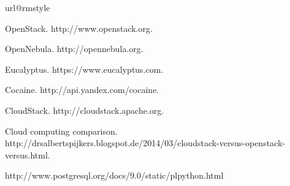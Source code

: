 
%
%
%

\begin{thebibliography}{10}
\providecommand{\url}[1]{#1}
\csname url@rmstyle\endcsname
\providecommand{\newblock}{\relax}
\providecommand{\bibinfo}[2]{#2}
\providecommand\BIBentrySTDinterwordspacing{\spaceskip=0pt\relax}
\providecommand\BIBentryALTinterwordstretchfactor{4}
\providecommand\BIBentryALTinterwordspacing{\spaceskip=\fontdimen2\font plus
\BIBentryALTinterwordstretchfactor\fontdimen3\font minus
  \fontdimen4\font\relax}
\providecommand\BIBforeignlanguage[2]{{%
\expandafter\ifx\csname l@#1\endcsname\relax
\typeout{** WARNING: IEEEtran.bst: No hyphenation pattern has been}%
\typeout{** loaded for the language `#1'. Using the pattern for}%
\typeout{** the default language instead.}%
\else
\language=\csname l@#1\endcsname
\fi
#2}}



OpenStack. http://www.openstack.org.

OpenNebula. http://opennebula.org.

Eucalyptus. https://www.eucalyptus.com.

Cocaine. http://api.yandex.com/cocaine.

CloudStack. http://cloudstack.apache.org.

Cloud computing comparison. http://drsalbertspijkers.blogspot.de/2014/03/cloudstack-versus-openstack-versus.html.

http://www.postgresql.org/docs/9.0/static/plpython.html

\end{thebibliography}



